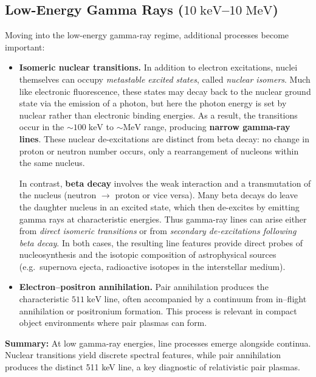 \subsection{Low-Energy Gamma Rays ($10\;\mathrm{keV}$--$10\;\mathrm{MeV}$)}

Moving into the low-energy gamma-ray regime, additional processes
become important:

\begin{itemize}
    \item \textbf{Isomeric nuclear transitions.}  
    In addition to electron excitations, nuclei themselves can occupy
    \emph{metastable excited states}, called \emph{nuclear isomers}. Much
    like electronic fluorescence, these states may decay back to the nuclear
    ground state via the emission of a photon, but here the photon energy is
    set by nuclear rather than electronic binding energies. As a result, the
    transitions occur in the $\sim 100\;\mathrm{keV}$ to $\sim \mathrm{MeV}$
    range, producing \textbf{narrow gamma-ray lines}. These nuclear
    de-excitations are distinct from beta decay: no change in proton or
    neutron number occurs, only a rearrangement of nucleons within the same
    nucleus. 
    
    In contrast, \textbf{beta decay} involves the weak interaction and a
    transmutation of the nucleus (neutron $\to$ proton or vice versa). Many
    beta decays do leave the daughter nucleus in an excited state, which
    then de-excites by emitting gamma rays at characteristic energies. Thus
    gamma-ray lines can arise either from \emph{direct isomeric transitions}
    or from \emph{secondary de-excitations following beta decay}. In both
    cases, the resulting line features provide direct probes of
    nucleosynthesis and the isotopic composition of astrophysical sources
    (e.g.~supernova ejecta, radioactive isotopes in the interstellar medium).

    \item \textbf{Electron--positron annihilation.}  
    Pair annihilation produces the characteristic $511\;\mathrm{keV}$
    line, often accompanied by a continuum from in--flight annihilation
    or positronium formation. This process is relevant in compact object
    environments where pair plasmas can form.
\end{itemize}

\begin{remark}
    \textbf{Summary:} At low gamma-ray energies, line processes emerge
    alongside continua. Nuclear transitions yield discrete spectral
    features, while pair annihilation produces the distinct 511 keV
    line, a key diagnostic of relativistic pair plasmas.
\end{remark}

